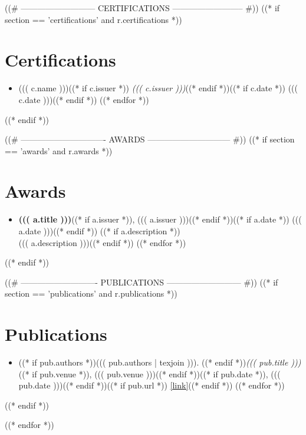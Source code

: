 \documentclass[10pt,letterpaper]{article}
\begin{document}
((# --------------------------- CERTIFICATIONS -------------------------- #))
((* if section == 'certifications' and r.certifications *))
\section{Certifications}
\begin{itemize}
((* for c in r.certifications *))
  \item ((( c.name )))((* if c.issuer *)) \textemdash{} \textit{((( c.issuer )))}((* endif *))((* if c.date *)) \hfill ((( c.date )))((* endif *))
((* endfor *))
\end{itemize}
((* endif *))

((# ------------------------------- AWARDS ------------------------------ #))
((* if section == 'awards' and r.awards *))
\section{Awards}
\begin{itemize}
((* for a in r.awards *))
  \item \textbf{((( a.title )))}((* if a.issuer *)), ((( a.issuer )))((* endif *))((* if a.date *)) \hfill ((( a.date )))((* endif *))
  ((* if a.description *))\\ {\small ((( a.description )))}((* endif *))
((* endfor *))
\end{itemize}
((* endif *))

((# ---------------------------- PUBLICATIONS --------------------------- #))
((* if section == 'publications' and r.publications *))
\section{Publications}
\begin{itemize}
((* for pub in r.publications *))
  \item ((* if pub.authors *))((( pub.authors | texjoin ))). ((* endif *))\textit{((( pub.title )))}((* if pub.venue *)), ((( pub.venue )))((* endif *))((* if pub.date *)), ((( pub.date )))((* endif *))((* if pub.url *)) \href{((( pub.url | url )))}{[link]}((* endif *))
((* endfor *))
\end{itemize}
((* endif *))

((* endfor *))
\end{document}
